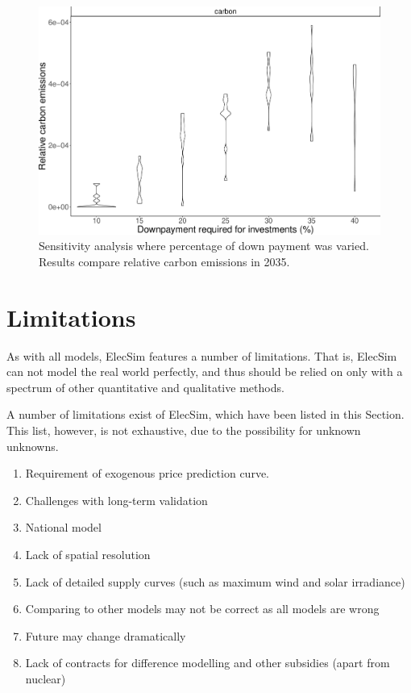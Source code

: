 \begin{figure}
	\centering
	\includegraphics[width=0.9\linewidth]{Chapter4/figures/sensitvity_analysis/downpayment_carbon_sensitivity_analysis.pdf}
	\caption{Sensitivity analysis where percentage of down payment was varied. Results compare relative carbon emissions in 2035.}
	\label{elecsim:fig:downpayment_carbon_sensitivity}
\end{figure}


\section{Limitations}
\label{elecsim:sec:limitations}

As with all models, ElecSim features a number of limitations. That is, ElecSim can not model the real world perfectly, and thus should be relied on only with a spectrum of other quantitative and qualitative methods. 

A number of limitations exist of ElecSim, which have been listed in this Section. This list, however, is not exhaustive, due to the possibility for unknown unknowns.

\begin{enumerate}
	\item Requirement of exogenous price prediction curve.
	\item Challenges with long-term validation
	\item National model
	\item Lack of spatial resolution
	\item Lack of detailed supply curves (such as maximum wind and solar irradiance)
	\item Comparing to other models may not be correct as all models are wrong
	\item Future may change dramatically
	\item Lack of contracts for difference modelling and other subsidies (apart from nuclear)
\end{enumerate}

